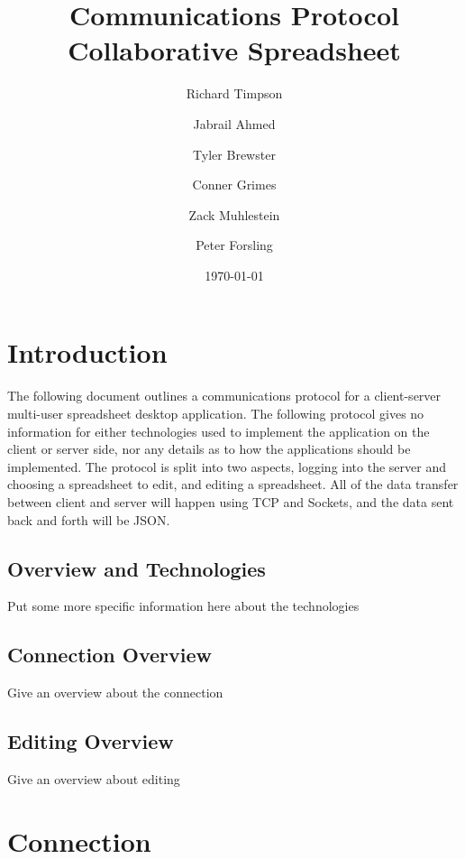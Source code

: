 \documentclass[titlepage]{article}
\title{Communications Protocol Collaborative Spreadsheet}
\author{Richard Timpson \and
        Jabrail Ahmed \and 
        Tyler Brewster \and 
        Conner Grimes \and 
        Zack Muhlestein \and 
        Peter Forsling }
\date{\today}
\begin{document}
\maketitle

\tableofcontents

\section{Introduction}
The following document outlines a communications protocol for a client-server 
multi-user spreadsheet desktop application. The following protocol gives no 
information for either technologies used to implement the application on the 
client or server side, nor any details as to how the applications should be 
implemented. The protocol is split into two aspects, logging into the server 
and choosing a spreadsheet to edit, and editing a spreadsheet. All of the data 
transfer between client and server will happen using TCP and Sockets, and the 
data sent back and forth will be JSON.
    \subsection{Overview and Technologies}
    Put some more specific information here about the technologies 
    \subsection{Connection Overview}
    Give an overview about the connection 
    \subsection{Editing Overview}
    Give an overview about editing 
\section{Connection}
\end{document}
